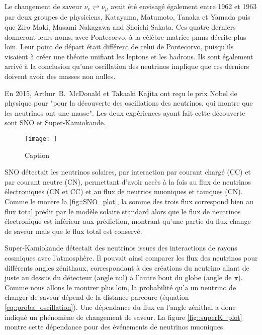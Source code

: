             Le changement de saveur $\nu_e\rightleftharpoons\nu_{\mu}$ avait été envisagé également entre 1962 et 1963 par deux groupes de physiciens, Katayama, Matumoto, Tanaka et Yamada\cite{Nakagawa1963} puis que Ziro Maki, Masami Nakagawa and Shoichi Sakata\cite{Maki1962}. Ces quatre derniers donneront leurs noms, avec Pontecorvo, à la célèbre matrice \gls{pmns} décrite plus loin. Leur point de départ était différent de celui de Pontecorvo, puisqu'ils visaient à créer une théorie unifiant les leptons et les hadrons. Ils sont également arrivé à la conclusion qu'une oscillation des neutrinos implique que ces derniers doivent avoir des masses non nulles.
            
            En 2015, Arthur~B.~McDonald et Takaaki Kajita ont reçu le prix Nobel de physique pour "pour la découverte des oscillations des neutrinos, qui montre que les neutrinos ont une masse". Les deux expériences ayant fait cette découverte sont SNO\cite{Aharmim2013} et Super-Kamiokande\cite{Fukuda1998}.
            
            \begin{figure}
                \texttt{[image: ]}
                \caption{Caption}
                \label{fig:my_label}
            \end{figure}
            
            SNO détectait les neutrinos solaires, par interaction par courant chargé (CC) et par courant neutre (CN), permettant d'avoir accès à la fois au flux de neutrinos électroniques (CN et CC) et au flux de neutrios muoniques et tauiques (CN). Comme le montre la \autoref{fig::SNO_plot}, la somme des trois flux correspond bien au flux total prédit par le modèle solaire standard alors que le flux de neutrinos électronique est inférieur aux prédiction, montrant qu'une partie du flux change de saveur mais que le flux total est conservé.
            
            Super-Kamiokande détectait des neutrinos issues des interactions de rayons cosmiques avec l'atmosphère. Il pouvait ainsi comparer les flux des neutrinos pour différents angles zénithaux, correspondant à des créations du neutrino allant de juste au dessus du détecteur (angle nul) à l'autre bout du globe (angle de $\pi$). Comme nous allons le montrer plus loin, la probabilité qu'a un neutrino de changer de saveur dépend de la distance parcoure (équation \eqref{eq::proba_oscillation}). Une dépendance du flux en l'angle zénithal a donc indiqué un phénomène de changement de saveur. La figure \autoref{fig::superK_plot} montre cette dépendance pour des événements de neutrinos muoniques.
    

